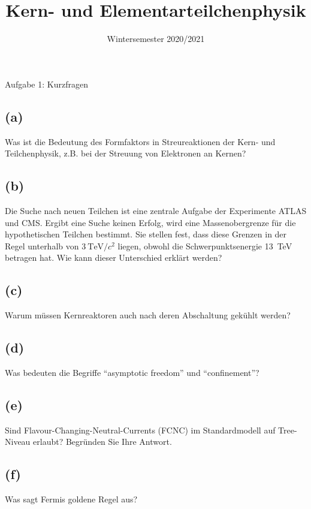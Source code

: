 

\subject{KET}
\title{Kern- und Elementarteilchenphysik}
\date{
    Wintersemester 2020/2021
}



\maketitle
\thispagestyle{empty}
\newpage


\begin{aufgabe}{Aufgabe 1: Kurzfragen}
\subsection{(a)}
Was ist die Bedeutung des Formfaktors in Streureaktionen der Kern- und Teilchenphysik,
z.B. bei der Streuung von Elektronen an Kernen?

\subsection{(b)}
Die Suche nach neuen Teilchen ist eine zentrale Aufgabe der Experimente ATLAS und CMS.
Ergibt eine Suche keinen Erfolg, wird eine Massenobergrenze für die hypothetischen Teilchen bestimmt.
Sie stellen fest, dass diese Grenzen in der Regel unterhalb von $\SI{3}{\tera\electronvolt}/c^2$ liegen,
obwohl die Schwerpunktsenergie \SI{13}{\tera\electronvolt} betragen hat.
Wie kann dieser Unterschied erklärt werden?

\subsection{(c)}
Warum müssen Kernreaktoren auch nach deren Abschaltung gekühlt werden?

\subsection{(d)}
Was bedeuten die Begriffe \enquote{asymptotic freedom} und \enquote{confinement}?

\subsection{(e)}
Sind Flavour-Changing-Neutral-Currents (FCNC) im Standardmodell auf Tree-Niveau erlaubt?
Begründen Sie Ihre Antwort.

\subsection{(f)}
Was sagt Fermis goldene Regel aus?


\end{aufgabe}
